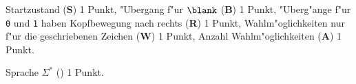 \begin{bewertung}
\begin{teilaufgaben}
\item
Startzustand ({\bf S}) 1 Punkt,
"Ubergang f"ur $\blank$ ({\bf B}) 1 Punkt,
"Uberg"ange f"ur \texttt{0} und \texttt{1} haben Kopfbewegung nach rechts
({\bf R}) 1 Punkt,
Wahlm"oglichkeiten nur f"ur die geschriebenen Zeichen ({\bf W}) 1 Punkt,
Anzahl Wahlm"oglichkeiten ({\bf A}) 1 Punkt.
\item
Sprache $\Sigma^*$ ({\bf *}) 1 Punkt.
\end{teilaufgaben}
\end{bewertung}


